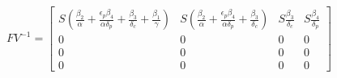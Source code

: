 \documentclass[preview]{standalone}
\begin{document}
\begin{align*}
FV^{-1} = \begin{bmatrix} S ( \frac{\beta_2}{\alpha} + \frac{\epsilon_p \beta_4}{\alpha \delta_p} + \frac{\beta_3}{\delta_c} + \frac{\beta_1}{\gamma} ) & S (\frac{\beta_2}{\alpha} + \frac{\epsilon_p \beta_4}{\alpha \delta_p} + \frac{\beta_3}{\delta_c}) & S \frac{\beta_3}{\delta_c} & S \frac{\beta_4}{\delta_p} \\ 0 & 0 & 0 & 0 \\ 0 & 0 & 0 & 0 \\ 0 & 0 & 0 & 0 \end{bmatrix}
\end{align*}
\end{document}
